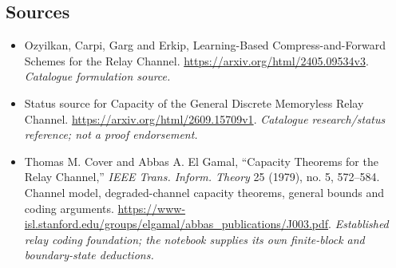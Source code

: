 \documentclass[11pt,a4paper]{article}
\numberwithin{equation}{section}
\begin{document}
\subsection{Sources}
\begin{itemize}\raggedright
\item[\textnormal{[S1]}]\hypertarget{source:30006765:1}{} Ozyilkan, Carpi, Garg and Erkip, Learning-Based Compress-and-Forward Schemes for the Relay Channel.
\url{https://arxiv.org/html/2405.09534v3}.
{\small\textit{Catalogue formulation source.}}
\item[\textnormal{[S2]}]\hypertarget{source:30006765:2}{} Status source for Capacity of the General Discrete Memoryless Relay Channel.
\url{https://arxiv.org/html/2609.15709v1}.
{\small\textit{Catalogue research/status reference; not a proof endorsement.}}
\item[\textnormal{[E1]}]\hypertarget{extra:30006765:1}{} Thomas M. Cover and Abbas A. El Gamal, ``Capacity Theorems for the Relay Channel,'' \emph{IEEE Trans. Inform. Theory} 25 (1979), no. 5, 572--584. Channel model, degraded-channel capacity theorems, general bounds and coding arguments.
\url{https://www-isl.stanford.edu/groups/elgamal/abbas_publications/J003.pdf}.
{\small\textit{Established relay coding foundation; the notebook supplies its own finite-block and boundary-state deductions.}}
\end{itemize}
\end{document}
